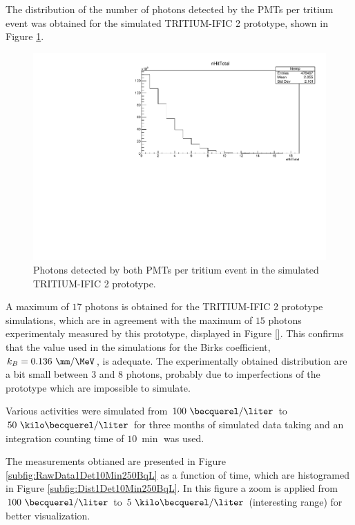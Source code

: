 The distribution of the number of photons detected by the PMTs per tritium event was obtained for the simulated TRITIUM-IFIC 2 prototype, shown in Figure \ref{fig:SimulatedPhotonsDetected}.

\begin{figure}[hbtp]
\centering
\includegraphics[scale=0.65]{Figures/8SimulationsResults/82TRITIUMMonitor/821TRITIUMIFIC2/PhotonsDetected_simulation.pdf}
\caption{Photons detected by both PMTs per tritium event in the simulated TRITIUM-IFIC 2 prototype.\label{fig:SimulatedPhotonsDetected}}
\end{figure}

A maximum of $17$ photons is obtained for the TRITIUM-IFIC 2 prototype simulations, which are in agreement with the maximum of $15$ photons experimentaly measured by this prototype, displayed in Figure \ref{}. This confirms that the value used in the simulations for the Birks coefficient, $k_B=0.136~\mm/\MeV$, is adequate. The experimentally obtained distribution are a bit small between $3$ and $8$ photons, probably due to imperfections of the prototype which are impossible to simulate.

Various activities were simulated from $100~\becquerel/\liter$ to $50~\kilo\becquerel/\liter$ for three months of simulated data taking and an integration counting time of $10~\min$ was used.

The measurements obtianed are presented in Figure \ref{subfig:RawData1Det10Min250BqL} as a function of time, which are histogramed in Figure \ref{subfig:Dist1Det10Min250BqL}. In this figure a zoom is applied from $100~\becquerel/\liter$ to $5~\kilo\becquerel/\liter$ (interesting range) for better visualization.


